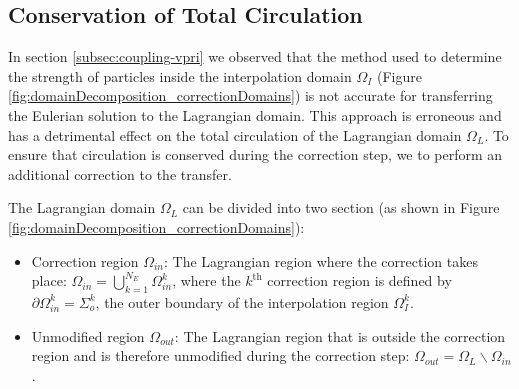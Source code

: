 	\subsection{Conservation of Total Circulation}
	\label{subsec:coupling-cotc}
	
	In section \ref{subsec:coupling-vpri} we observed that the method used to determine the strength of particles inside the interpolation domain $\Omega_{I}$ (Figure \ref{fig:domainDecomposition_correctionDomains}) is not accurate for transferring the Eulerian solution to the Lagrangian domain. This approach is erroneous and has a detrimental effect on the total circulation of the Lagrangian domain $\Omega_L$. To ensure that circulation is conserved during the correction step, we to perform an additional correction to the transfer. 
	
	The Lagrangian domain $\Omega_L$ can be divided into two section (as shown in Figure \ref{fig:domainDecomposition_correctionDomains}): 
		\begin{itemize}
		\item Correction region $\Omega_{in}$: The Lagrangian region where the correction takes place: $\Omega_{in} = \bigcup_{k=1}^{N_E}{\Omega_{in}^k}$, where the $k^{\mathrm{th}}$ correction region is defined by $\partial\Omega_{in}^k = \Sigma_{o}^k$, the outer boundary of the interpolation region $\Omega_I^k$.
		\item Unmodified region $\Omega_{out}$: The Lagrangian region that is outside the correction region and is therefore unmodified during the correction step: $\Omega_{out} = \Omega_L\backslash\Omega_{in}$.
		\end{itemize}
	
